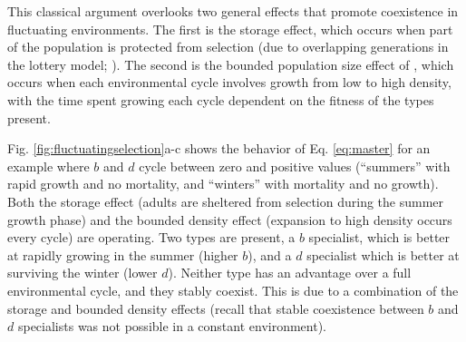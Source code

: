 \documentclass[11pt]{article}
\begin{document}
This classical argument overlooks two general effects that promote coexistence in fluctuating environments. The first is the storage effect, which occurs when part of the population is protected from selection (due to overlapping generations in the lottery model; \citealt{chesson_1981}). The second is the  bounded population size effect of \cite{yi_2013}, which occurs when each environmental cycle involves growth from low to high density, with the time spent growing each cycle dependent on the fitness of the types present.



Fig. \ref{fig:fluctuatingselection}a-c shows the behavior of Eq. \eqref{eq:master} for an example where $b$ and $d$ cycle between zero and positive values (``summers'' with rapid growth and no mortality, and ``winters'' with mortality and no growth). Both the storage effect (adults are sheltered from selection during the summer growth phase) and the bounded density effect (expansion to high density occurs every cycle) are operating. Two types are present, a $b$ specialist, which is better at rapidly growing in the summer (higher $b$), and a $d$ specialist which is better at surviving the winter (lower $d$). Neither type has an advantage over a full environmental cycle, and they stably coexist. This is due to a combination of the storage and bounded density effects (recall that stable coexistence between $b$ and $d$ specialists was not possible in a constant environment). 
\end{document}

